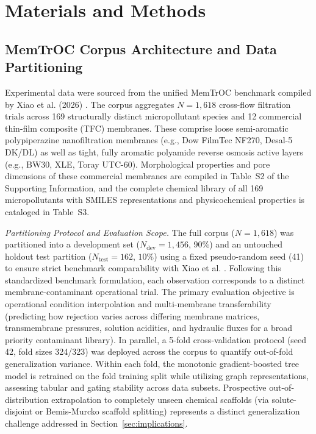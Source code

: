 \documentclass[11pt]{article}
\begin{document}
\section{Materials and Methods}
\label{sec:methods}

\subsection{MemTrOC Corpus Architecture and Data Partitioning}
\label{subsec:dataset}

Experimental data were sourced from the unified MemTrOC benchmark compiled by Xiao et al. (2026) \cite{xiao2026}. The corpus aggregates $N = 1{,}618$ cross-flow filtration trials across 169 structurally distinct micropollutant species and 12 commercial thin-film composite (TFC) membranes. These comprise loose semi-aromatic polypiperazine nanofiltration membranes (e.g., Dow FilmTec NF270, Desal-5 DK/DL) as well as tight, fully aromatic polyamide reverse osmosis active layers (e.g., BW30, XLE, Toray UTC-60). Morphological properties and pore dimensions of these commercial membranes are compiled in Table~S2 of the Supporting Information, and the complete chemical library of all 169 micropollutants with SMILES representations and physicochemical properties is cataloged in Table~S3.

\textit{Partitioning Protocol and Evaluation Scope.} The full corpus ($N = 1{,}618$) was partitioned into a development set ($N_{\mathrm{dev}} = 1{,}456$, $90\%$) and an untouched holdout test partition ($N_{\mathrm{test}} = 162$, $10\%$) using a fixed pseudo-random seed (41) to ensure strict benchmark comparability with Xiao et al. \cite{xiao2026}. Following this standardized benchmark formulation, each observation corresponds to a distinct membrane-contaminant operational trial. The primary evaluation objective is operational condition interpolation and multi-membrane transferability (predicting how rejection varies across differing membrane matrices, transmembrane pressures, solution acidities, and hydraulic fluxes for a broad priority contaminant library). In parallel, a 5-fold cross-validation protocol (seed 42, fold sizes 324/323) was deployed across the corpus to quantify out-of-fold generalization variance. Within each fold, the monotonic gradient-boosted tree model is retrained on the fold training split while utilizing graph representations, assessing tabular and gating stability across data subsets. Prospective out-of-distribution extrapolation to completely unseen chemical scaffolds (via solute-disjoint or Bemis-Murcko scaffold splitting) represents a distinct generalization challenge addressed in Section~\ref{sec:implications}.
\end{document}
